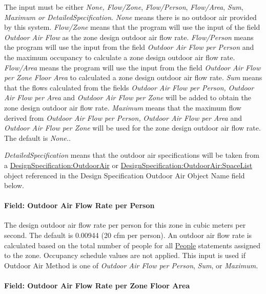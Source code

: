 The input must be either \emph{None, Flow/Zone}, \emph{Flow/Person}, \emph{Flow/Area}, \emph{Sum}, \emph{Maximum or DetailedSpecification}. \emph{None} means there is no outdoor air provided by this system. \emph{Flow/Zone} means that the program will use the input of the field \emph{Outdoor Air Flow} as the zone design outdoor air flow rate. \emph{Flow/Person} means the program will use the input from the field \emph{Outdoor Air Flow per Person} and the maximum occupancy to calculate a zone design outdoor air flow rate. \emph{Flow/Area} means the program will use the input from the field \emph{Outdoor Air Flow per Zone Floor Area} to calculated a zone design outdoor air flow rate. \emph{Sum} means that the flows calculated from the fields \emph{Outdoor Air Flow per Person,} \emph{Outdoor Air Flow per Area} and \emph{Outdoor Air Flow per Zone} will be added to obtain the zone design outdoor air flow rate. \emph{Maximum} means that the maximum flow derived from \emph{Outdoor Air Flow per Person,} \emph{Outdoor Air Flow per Area} and \emph{Outdoor Air Flow per Zone} will be used for the zone design outdoor air flow rate. The default is \emph{None.}.

\emph{DetailedSpecification} means that the outdoor air specifications will be taken from a \hyperref[designspecificationoutdoorair]{DesignSpecification:OutdoorAir} or \hyperref[designspecificationoutdoorairspacelist]{DesignSpecification:OutdoorAir:SpaceList} object referenced in the Design Specification Outdoor Air Object Name field below.

\paragraph{Field: Outdoor Air Flow Rate per Person}\label{field-outdoor-air-flow-rate-per-person}

The design outdoor air flow rate per person for this zone in cubic meters per second. The default is 0.00944 (20 cfm per person). An outdoor air flow rate is calculated based on the total number of people for all \hyperref[people]{People} statements assigned to the zone. Occupancy schedule values are not applied. This input is used if Outdoor Air Method is one of \emph{Outdoor Air Flow per Person}, \emph{Sum}, or \emph{Maximum.}

\paragraph{Field: Outdoor Air Flow Rate per Zone Floor Area}\label{field-outdoor-air-flow-rate-per-zone-floor-area}

